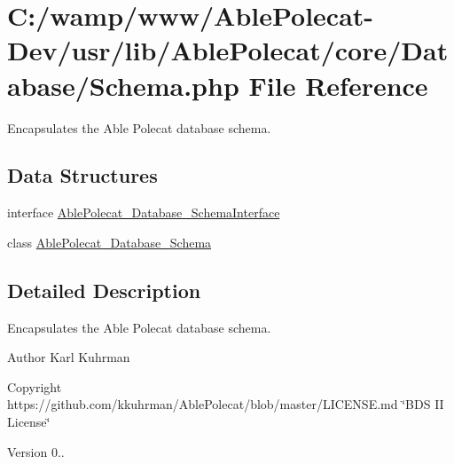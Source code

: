 \hypertarget{_schema_8php}{}\section{C\+:/wamp/www/\+Able\+Polecat-\/\+Dev/usr/lib/\+Able\+Polecat/core/\+Database/\+Schema.php File Reference}
\label{_schema_8php}


Encapsulates the Able Polecat database schema.  


\subsection*{Data Structures}
\begin{DoxyCompactItemize}
\item 
interface \hyperlink{interface_able_polecat___database___schema_interface}{Able\+Polecat\+\_\+\+Database\+\_\+\+Schema\+Interface}
\item 
class \hyperlink{class_able_polecat___database___schema}{Able\+Polecat\+\_\+\+Database\+\_\+\+Schema}
\end{DoxyCompactItemize}


\subsection{Detailed Description}
Encapsulates the Able Polecat database schema. 

\begin{DoxyAuthor}{Author}
Karl Kuhrman 
\end{DoxyAuthor}
\begin{DoxyCopyright}{Copyright}
https\+://github.com/kkuhrman/\+Able\+Polecat/blob/master/\+L\+I\+C\+E\+N\+S\+E.\+md \char`\"{}\+B\+D\+S I\+I License\char`\"{} 
\end{DoxyCopyright}
\begin{DoxyVersion}{Version}
0.. 
\end{DoxyVersion}
